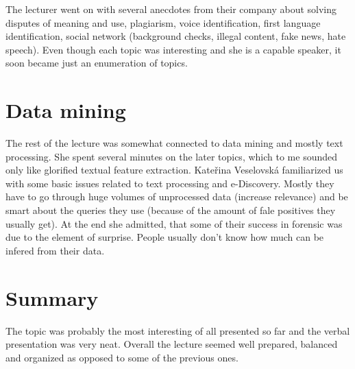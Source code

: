 \documentclass[a4paper]{article}
\begin{document}
The lecturer went on with several anecdotes from their company about solving disputes of meaning and use, plagiarism, voice identification, first language identification, social network (background checks, illegal content, fake news, hate speech). Even though each topic was interesting and she is a capable speaker, it soon became just an enumeration of topics.

\section*{Data mining}

The rest of the lecture was somewhat connected to data mining and mostly text processing. She spent several minutes on the later topics, which to me sounded only like glorified textual feature extraction. Kateřina Veselovská familiarized us with some basic issues related to text processing and e-Discovery. Mostly they have to go through huge volumes of unprocessed data (increase relevance) and be smart about the queries they use (because of the amount of fale positives they usually get). At the end she admitted, that some of their success in forensic was due to the element of surprise. People usually don't know how much can be infered from their data.

\section*{Summary}

The topic was probably the most interesting of all presented so far and the verbal presentation was very neat. Overall the lecture seemed well prepared, balanced and organized as opposed to some of the previous ones.
\end{document}
